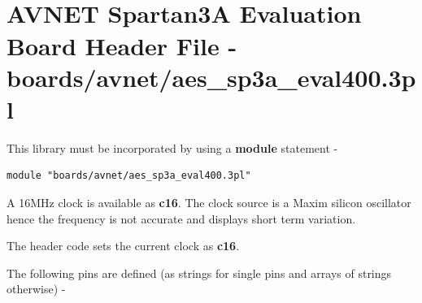 \pagebreak

\section{\\AVNET Spartan3A Evaluation Board Header File - boards/avnet/aes\_sp3a\_eval400.3pl}

    
    This library must be incorporated by using a {\bf module} statement -
    \begin{lstlisting}[gobble=4, language=threepl]
       module "boards/avnet/aes_sp3a_eval400.3pl"
    \end{lstlisting}
    
    A 16MHz clock is available as {\bf c16}. The clock source is a Maxim silicon
    oscillator hence the frequency is not accurate and displays short term
    variation.
    
    The header code sets the current clock as {\bf c16}.

    The following pins are defined (as strings for single pins and arrays
    of strings otherwise) -

